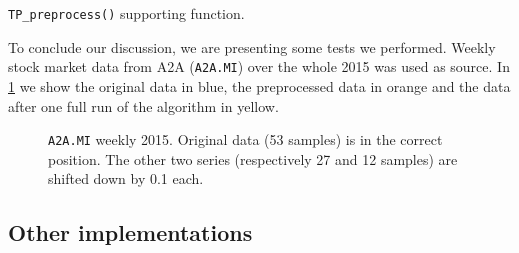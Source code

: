 \documentclass[a4paper]{article}
\begin{document}
\begin{listing}[H]
 
\inputminted[firstline = 53, lastline = 78]{matlab}{../code/TurningPoints.m}

\caption{\texttt{TP\_preprocess()} supporting function.}\label{lst:preprocess}

\end{listing}


To conclude our discussion, we are presenting some tests we performed. Weekly stock market data from A2A (\texttt{A2A.MI}) over the whole 2015 was used as source. In \cref{fig:a2a_w_2015} we show the original data in blue, the preprocessed data in orange and the data after one full run of the algorithm in yellow. %

\begin{figure}[H]
	
	
	\caption{\texttt{A2A.MI} weekly 2015. Original data (53 samples) is in the correct position. The other two series (respectively 27 and 12 samples) are shifted down by 0.1 each.}
	
	\label{fig:a2a_w_2015}

\end{figure}


\subsection{Other implementations} 
\lipsum[4-6]

\clearpage

\cite{5961935}
\cite{Yu2006}
\cite{Chung:2004:EAP:2221374.2221698}   
\cite{2426554}
\cite{Fu2007347}
\cite{Fu2008277}
\cite{5250725}
\cite{Fu2011164}
\cite{Fu20081217}



\printbibliography[title={Bibliography}, prenote=prenote]
\end{document}
